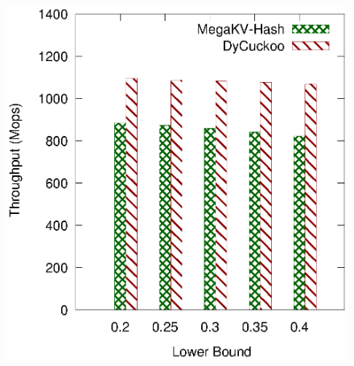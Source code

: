 \begin{figure}[htp]
\begin{minipage}{0.19\linewidth}
		\centerline{\dsali}
	\end{minipage}
	\begin{minipage}{0.19\linewidth}\centering
		\includegraphics[width=\linewidth]{pic/dynamic/lower/dynamic_random.eps}
		\centerline{\dsrandom}
	\end{minipage}
	\caption{}
	\label{fig:vary-lower-time}
\end{figure}


